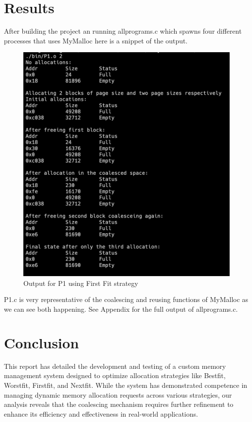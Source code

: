 \documentclass[conference]{IEEEtran}
\begin{document}
\section{Results}
After building the project an running allprograms.c which spawns four different processes that uses MyMalloc here is a snippet of the output. 
\begin{figure}[H]
    \includegraphics[width=\linewidth]{p1.png}
    \caption{Output for P1 using First Fit strategy}
\end{figure}
P1.c is very representative of the coalescing and reusing functions of MyMalloc as we can see both happening.
See Appendix for the full output of allprograms.c.

\section{Conclusion}
This report has detailed the development and testing of a custom memory management system designed to optimize allocation strategies like Bestfit, Worstfit, Firstfit, and Nextfit. While the system has demonstrated competence in managing dynamic memory allocation requests across various strategies, our analysis reveals that the coalescing mechanism requires further refinement to enhance its efficiency and effectiveness in real-world applications.
\end{document}

